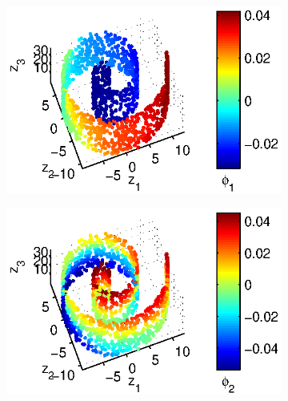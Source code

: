 \documentclass[3p]{elsarticle}
\begin{document}
\begin{figure}[!t]
\begin{subfigure}{0.25\textwidth}
\caption{}
\label{subfig:swissroll1_evals}
\end{subfigure}
%
\begin{subfigure}{0.25\textwidth}
\centering
\includegraphics[width=\textwidth]{swissroll1_color1} 
\caption{}
\label{subfig:swissroll1_color1}
\end{subfigure}
%
\begin{subfigure}{0.25\textwidth}
\centering
\includegraphics[width=\textwidth]{swissroll1_color2}
\caption{}
\label{subfig:swissroll1_color2}
\end{subfigure}


\end{figure}
\end{document}
